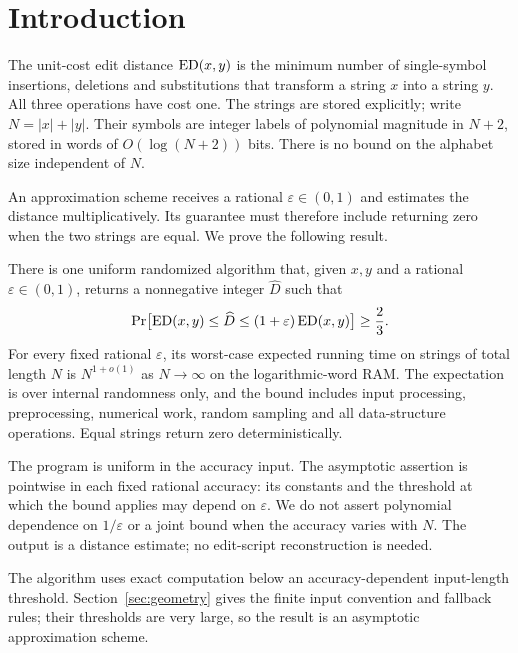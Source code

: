\section{Introduction}\label{sec:intro}
The unit-cost edit distance $\operatorname{ED}(x,y)$ is the minimum number of
single-symbol insertions, deletions and substitutions that transform a string
$x$ into a string $y$. All three operations have cost one. The strings are
stored explicitly; write $N=|x|+|y|$. Their symbols are integer labels of
polynomial magnitude in $N+2$, stored in words of $O(\log(N+2))$ bits.
There is no bound on the alphabet size independent of $N$.

An approximation scheme receives a rational $\varepsilon\in(0,1)$ and
estimates the distance multiplicatively. Its guarantee must therefore include
returning zero when the two strings are equal. We prove the following result.

\begin{theorem}\label{thm:main}
There is one uniform randomized algorithm that, given $x,y$ and a rational
$\varepsilon\in(0,1)$, returns a nonnegative integer $\widehat D$ such that
\[
 \Pr\bigl[\operatorname{ED}(x,y)\le \widehat D\le(1+\varepsilon)\operatorname{ED}(x,y)\bigr]
 \ge \frac23.
\]
For every fixed rational $\varepsilon$, its worst-case expected running time
on strings of total length $N$ is $N^{1+o(1)}$ as $N\to\infty$ on the
logarithmic-word RAM. The expectation is over internal randomness only,
and the bound includes input processing, preprocessing, numerical work,
random sampling and all data-structure operations. Equal strings return zero
deterministically.
\end{theorem}

The program is uniform in the accuracy input. The asymptotic assertion is
pointwise in each fixed rational accuracy: its constants and the threshold
at which the bound applies may depend on $\varepsilon$. We do not assert
polynomial dependence on $1/\varepsilon$ or a joint bound when the accuracy
varies with $N$. The output is a distance estimate; no edit-script
reconstruction is needed.

The algorithm uses exact computation below an accuracy-dependent input-length
threshold. Section~\ref{sec:geometry} gives the finite input convention and
fallback rules; their thresholds are very large, so the result is an
asymptotic approximation scheme.

